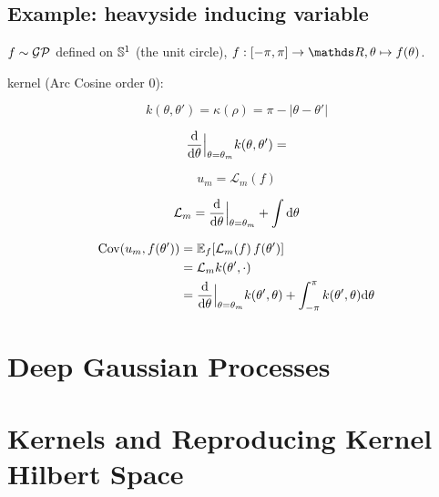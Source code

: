 \subsection{Example: heavyside inducing variable}

$f \sim \mathcal{GP}$ defined on $\mathbb{S}^1$ (the unit circle), $f: [-\pi, \pi] \rightarrow \Reals, \theta \mapsto f(\theta)$.

kernel (Arc Cosine order 0):

\begin{equation}
  k(\theta, \theta') = \kappa(\rho) = \pi - |\theta - \theta'|
\end{equation}

\begin{equation}
  \frac{\mathrm{d}{}}{\mathrm{d}{\theta}}\Bigr|_{\theta = \theta_m} k(\theta, \theta') = 
\end{equation}

\begin{equation}
  u_m = \mathcal{L}_m(f)
\end{equation}

\begin{equation}
  \mathcal{L}_m = \frac{\mathrm{d}{}}{\mathrm{d}{\theta}}\Bigr|_{\theta = \theta_m} + \int \mathrm{d}{\theta}
\end{equation}

\begin{align}
  \Cov(u_m, f(\theta')) &= \Exp{f}{\mathcal{L}_m(f)\,f(\theta')} \\
                      &=  \mathcal{L}_m k(\theta', \cdot) \\
                      &= \frac{\calcd{}}{\calcd{\theta}}\Bigr|_{\theta = \theta_m} k(\theta', \theta) + \int_{-\pi}^\pi k(\theta', \theta) \calcd{\theta}
\end{align}



\section{Deep Gaussian Processes}



\section{Kernels and Reproducing Kernel Hilbert Space}

